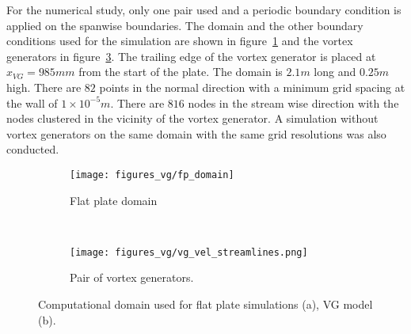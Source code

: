 For the numerical study, only one pair used and a periodic boundary condition is applied on the spanwise boundaries. The domain and the other boundary conditions used for the simulation are shown in figure~\ref{fig:fpdomain} and the vortex generators in figure~\ref{fig:vgstrm}. The trailing edge of the vortex generator is placed at $x_{VG}=985mm$ from the start of the plate. The domain is $2.1m$ long and $0.25m$ high. There are $82$ points in the normal direction with a minimum grid spacing at the wall of $1\times 10^{-5} m$. There are $816$ nodes in the stream wise direction with the nodes clustered in the vicinity of the vortex generator. A simulation without vortex generators on the same domain with the same grid resolutions was also conducted. 
\begin{figure}[h!]
    \centering
    \captionsetup{justification=centering}
    \begin{subfigure}[b]{0.48\textwidth}
    \captionsetup{justification=centering}
        \texttt{[image: figures\_vg/fp\_domain]}
        \caption{Flat plate domain}
        \label{fig:fpdomain}
    \end{subfigure}
    ~ %
    \begin{subfigure}[b]{0.48\textwidth}
    \centering
    \captionsetup{justification=centering}
        \texttt{[image: figures\_vg/vg\_vel\_streamlines.png]}
        \caption{Pair of vortex generators.}
        \label{fig:vgstrm}
    \end{subfigure}
    \caption{Computational domain used for flat plate simulations (a), VG model (b).}
\end{figure}

